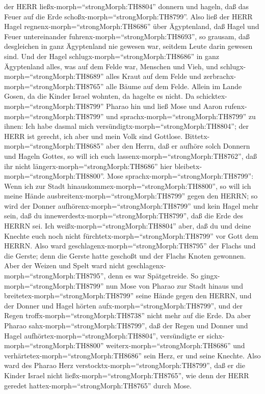 der HERR ließx-morph=``strongMorph:TH8804'' donnern und hageln, daß das
Feuer auf die Erde schoßx-morph=``strongMorph:TH8799''. Also ließ der
HERR Hagel regnenx-morph=``strongMorph:TH8686'' über Ägyptenland,
 daß Hagel und Feuer untereinander
fuhrenx-morph=``strongMorph:TH8693'', so grausam, daß desgleichen in
ganz Ägyptenland nie gewesen war, seitdem Leute darin gewesen sind.
 Und der Hagel schlugx-morph=``strongMorph:TH8686'' in ganz
Ägyptenland alles, was auf dem Felde war, Menschen und Vieh, und
schlugx-morph=``strongMorph:TH8689'' alles Kraut auf dem Felde und
zerbrachx-morph=``strongMorph:TH8765'' alle Bäume auf dem Felde.
 Allein im Lande Gosen, da die Kinder Israel wohnten, da
hagelte es nicht.  Da
schicktex-morph=``strongMorph:TH8799'' Pharao hin und ließ Mose und
Aaron rufenx-morph=``strongMorph:TH8799'' und
sprachx-morph=``strongMorph:TH8799'' zu ihnen: Ich habe dasmal mich
versündigtx-morph=``strongMorph:TH8804''; der HERR ist gerecht, ich aber
und mein Volk sind Gottlose. 
Bittetx-morph=``strongMorph:TH8685'' aber den Herrn, daß er aufhöre
solch Donnern und Hageln Gottes, so will ich euch
lassenx-morph=``strongMorph:TH8762'', daß ihr nicht
längerx-morph=``strongMorph:TH8686'' hier
bleibetx-morph=``strongMorph:TH8800''.  Mose
sprachx-morph=``strongMorph:TH8799'': Wenn ich zur Stadt
hinauskommex-morph=``strongMorph:TH8800'', so will ich meine Hände
ausbreitenx-morph=``strongMorph:TH8799'' gegen den HERRN; so wird der
Donner aufhörenx-morph=``strongMorph:TH8799'' und kein Hagel mehr sein,
daß du innewerdestx-morph=``strongMorph:TH8799'', daß die Erde des HERRN
sei.  Ich weißx-morph=``strongMorph:TH8804'' aber, daß du
und deine Knechte euch noch nicht fürchtetx-morph=``strongMorph:TH8799''
vor Gott dem HERRN.  Also ward
geschlagenx-morph=``strongMorph:TH8795'' der Flachs und die Gerste; denn
die Gerste hatte geschoßt und der Flachs Knoten gewonnen. 
Aber der Weizen und Spelt ward nicht
geschlagenx-morph=``strongMorph:TH8795'', denn es war Spätgetreide.
 So gingx-morph=``strongMorph:TH8799'' nun Mose von Pharao
zur Stadt hinaus und breitetex-morph=``strongMorph:TH8799'' seine Hände
gegen den HERRN, und der Donner und Hagel hörten
aufx-morph=``strongMorph:TH8799'', und der Regen
troffx-morph=``strongMorph:TH8738'' nicht mehr auf die Erde.
 Da aber Pharao sahx-morph=``strongMorph:TH8799'', daß der
Regen und Donner und Hagel aufhörtex-morph=``strongMorph:TH8804'',
versündigte er sichx-morph=``strongMorph:TH8800''
weiterx-morph=``strongMorph:TH8686'' und
verhärtetex-morph=``strongMorph:TH8686'' sein Herz, er und seine
Knechte.  Also ward des Pharao Herz
verstocktx-morph=``strongMorph:TH8799'', daß er die Kinder Israel nicht
ließx-morph=``strongMorph:TH8765'', wie denn der HERR geredet
hattex-morph=``strongMorph:TH8765'' durch Mose.


